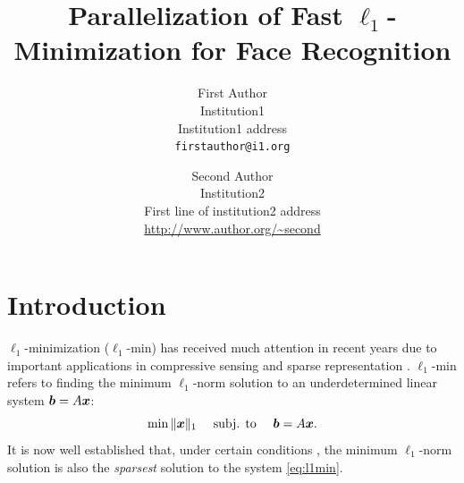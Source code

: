 \documentclass[10pt,twocolumn,letterpaper]{article}
\begin{document}
\title{Parallelization of Fast $\ell_1$-Minimization for Face Recognition}

\author{First Author\\
Institution1\\
Institution1 address\\
{\tt\small firstauthor@i1.org}
\and
Second Author\\
Institution2\\
First line of institution2 address\\
{\small\url{http://www.author.org/~second}}
}

\maketitle

\begin{abstract}

\end{abstract}

\section{Introduction} 
$\ell_1$-minimization ($\ell_1$-min) has received much attention in recent
years due to important applications in compressive sensing
\cite{BrucksteinA2007} and sparse representation \cite{WrightJ2010-PIEEE}.  
$\ell_1$-min refers to finding the minimum $\ell_1$-norm solution to an
underdetermined linear system ${\boldsymbol{b}}=A{\boldsymbol{x}}$:
\begin{equation}
\min \|{\boldsymbol{x}}\|_1\quad \mbox{ subj. to }\quad {\boldsymbol{b}} = A{\boldsymbol{x}}.
\label{eq:l1min}
\end{equation}
It is now well established that, under certain conditions
\cite{CandesE2005-IT_1,DonohoD2004}, the minimum $\ell_1$-norm solution is also
the \emph{sparsest} solution to the system \eqref{eq:l1min}.
\end{document}
